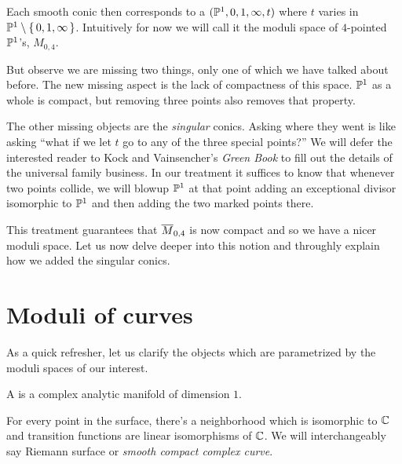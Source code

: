 \documentclass[12pt]{memoir}
\begin{document}
 Each smooth conic then corresponds to a $(\mathbb{P}^1, 0, 1, \infty, t)$ where $t$ varies in $\mathbb{P}^1 \setminus \{\,0,1,\infty\,\}$. Intuitively for now we will call it the moduli space of $4$-pointed $\mathbb{P}^1$'s, $M_{0,4}$.\par

 But observe we are missing two things, only one of which we have talked about before. The new missing aspect is the lack of compactness of this space. $\mathbb{P}^1$ as a whole is compact, but removing three points also removes that property.\par
 The other missing objects are the \emph{singular} conics. Asking where they went is like asking ``what if we let $t$ go to any of the three special points?'' We will defer the interested reader to Kock and Vainsencher's \emph{Green Book} \cite{GreenBookKockVainsencher} to fill out the details of the universal family business. In our treatment it suffices to know that whenever two points collide, we will blowup $\mathbb{P}^1$ at that point adding an exceptional divisor isomorphic to $\mathbb{P}^1$ and then adding the two marked points there.\par
 This treatment guarantees that $\overline M_{0,4}$ is now compact and so we have a nicer moduli space. Let us now delve deeper into this notion and throughly explain how we added the singular conics.


\section{Moduli of curves}

As a quick refresher, let us clarify the objects which are parametrized by the moduli spaces of our interest. 

\begin{Def}
    A  is a complex analytic manifold of dimension $1$. 
\end{Def}

For every point in the surface, there's a neighborhood which is isomorphic to $\mathbb{C}$ and transition functions are linear isomorphisms of $\mathbb{C}$. We will interchangeably say Riemann surface or \emph{smooth compact complex curve}.
    
\end{document}
